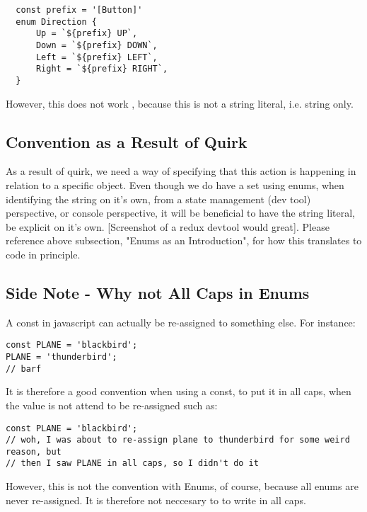 \begin{lstlisting}
  const prefix = '[Button]'
  enum Direction {
      Up = `${prefix} UP`,
      Down = `${prefix} DOWN`,
      Left = `${prefix} LEFT`,
      Right = `${prefix} RIGHT`,
  }
\end{lstlisting}

However, this does not work , because this is not a string literal, i.e. string
only.

\subsection{ Convention as a Result of Quirk }
As a result of quirk, we need a way of specifying that this action is happening
in relation to a specific object. Even though we do have a set using enums,
when identifying the string on it's own, from a state management (dev tool)
perspective, or console perspective, it will be beneficial to have the string
literal, be explicit on it's own. [Screenshot of a redux devtool would great].
Please reference above subsection, "Enums as an Introduction", for how this
translates to code in principle.

\subsection{ Side Note - Why not All Caps in Enums }
A const in javascript can actually be re-assigned to something else. For
instance:
\begin{lstlisting}
const PLANE = 'blackbird';
PLANE = 'thunderbird';
// barf
\end{lstlisting}
It is therefore a good convention when using a const, to put it in all caps,
when the value is not attend to be re-assigned such as:
\begin{lstlisting}
const PLANE = 'blackbird';
// woh, I was about to re-assign plane to thunderbird for some weird reason, but
// then I saw PLANE in all caps, so I didn't do it
\end{lstlisting}

However, this is not the convention with Enums, of course, because all enums
are never re-assigned. It is therefore not neccesary to to write in all caps.
